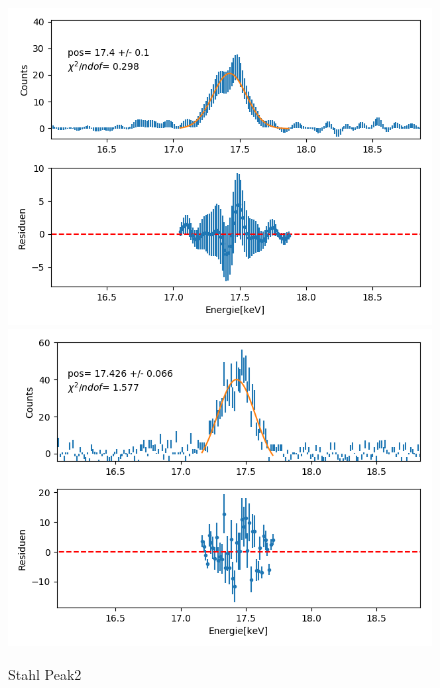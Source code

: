 \documentclass[12pt,a4paper]{article}
\begin{document}
\begin{figure}[H]
\centering
\includegraphics[scale=0.49]{Bilder/alpha_spektren/stahl_2_1.png}
\includegraphics[scale=0.49]{Bilder/alpha_spektren/stahl_2_2.png}
\caption{Stahl Peak2}
\end{figure}
\end{document}
